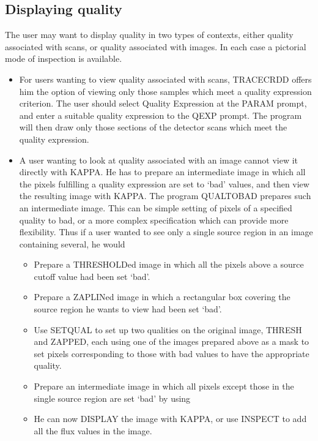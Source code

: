 \documentclass[twoside,11pt]{starlink}
\begin{document}
\subsection{Displaying quality}
The user may want to display quality in two types of contexts, either quality
associated with scans, or quality associated with images. In each case a
pictorial mode of inspection is available.
\begin{itemize}
\item For users wanting to view quality associated with scans, TRACECRDD offers
him the option of viewing only those samples which meet a quality expression
criterion. The user should select Quality Expression at the PARAM prompt, and
enter a suitable quality expression to the QEXP prompt. The program will then
draw only those sections of the detector scans which meet the quality
expression.
\item A user wanting to look at quality associated with an image cannot view it
directly with KAPPA. He has to prepare an intermediate image in which all the
pixels fulfilling a quality expression are set to `bad' values, and
then view the resulting image with KAPPA. The program QUALTOBAD prepares such an
intermediate image. This can be simple setting of pixels of a specified quality
to bad, or a more complex specification which can provide more flexibility. Thus
if a user wanted to see only a single source region in an image containing
several, he would
\begin{itemize}
\item Prepare a THRESHOLDed image in which all the pixels above a source cutoff
value had been set `bad'.
\item Prepare a ZAPLINed image in which a rectangular box covering the source
region he wants to view had been set `bad'.
\item Use SETQUAL to set up two qualities on the original image, THRESH and
ZAPPED, each using one of the images prepared above as a mask to set pixels
corresponding to those with bad values to have the appropriate quality.
\item Prepare an intermediate image in which all pixels except those in the
single source region are set `bad'  by using
\begin{small}
\end{small}
\item He can now DISPLAY the image with KAPPA, or use INSPECT to add all the
flux values in the image.
\end{itemize}
\end{itemize}
\end{document}

